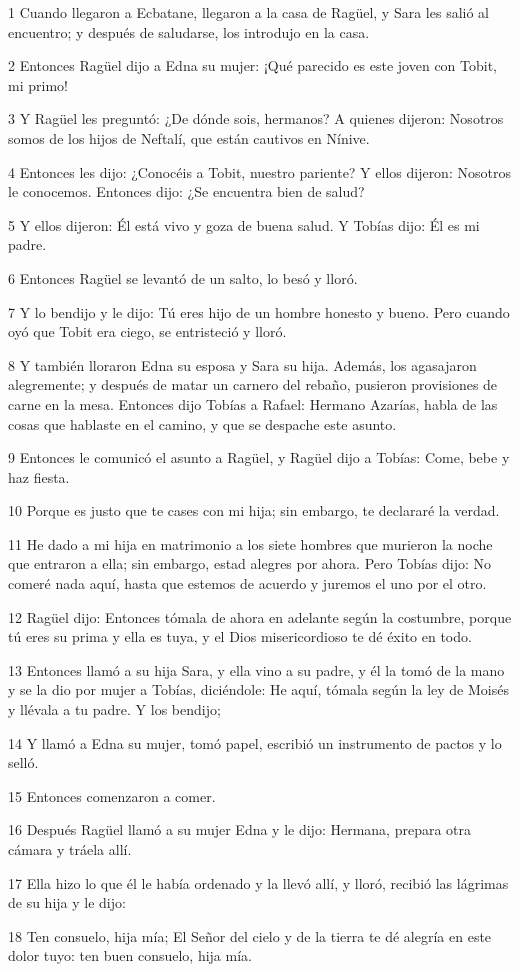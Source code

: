 \par 1 Cuando llegaron a Ecbatane, llegaron a la casa de Ragüel, y Sara les salió al encuentro; y después de saludarse, los introdujo en la casa.
\par 2 Entonces Ragüel dijo a Edna su mujer: ¡Qué parecido es este joven con Tobit, mi primo!
\par 3 Y Ragüel les preguntó: ¿De dónde sois, hermanos? A quienes dijeron: Nosotros somos de los hijos de Neftalí, que están cautivos en Nínive.
\par 4 Entonces les dijo: ¿Conocéis a Tobit, nuestro pariente? Y ellos dijeron: Nosotros le conocemos. Entonces dijo: ¿Se encuentra bien de salud?
\par 5 Y ellos dijeron: Él está vivo y goza de buena salud. Y Tobías dijo: Él es mi padre.
\par 6 Entonces Ragüel se levantó de un salto, lo besó y lloró.
\par 7 Y lo bendijo y le dijo: Tú eres hijo de un hombre honesto y bueno. Pero cuando oyó que Tobit era ciego, se entristeció y lloró.
\par 8 Y también lloraron Edna su esposa y Sara su hija. Además, los agasajaron alegremente; y después de matar un carnero del rebaño, pusieron provisiones de carne en la mesa. Entonces dijo Tobías a Rafael: Hermano Azarías, habla de las cosas que hablaste en el camino, y que se despache este asunto.
\par 9 Entonces le comunicó el asunto a Ragüel, y Ragüel dijo a Tobías: Come, bebe y haz fiesta.
\par 10 Porque es justo que te cases con mi hija; sin embargo, te declararé la verdad.
\par 11 He dado a mi hija en matrimonio a los siete hombres que murieron la noche que entraron a ella; sin embargo, estad alegres por ahora. Pero Tobías dijo: No comeré nada aquí, hasta que estemos de acuerdo y juremos el uno por el otro.
\par 12 Ragüel dijo: Entonces tómala de ahora en adelante según la costumbre, porque tú eres su prima y ella es tuya, y el Dios misericordioso te dé éxito en todo.
\par 13 Entonces llamó a su hija Sara, y ella vino a su padre, y él la tomó de la mano y se la dio por mujer a Tobías, diciéndole: He aquí, tómala según la ley de Moisés y llévala a tu padre. Y los bendijo;
\par 14 Y llamó a Edna su mujer, tomó papel, escribió un instrumento de pactos y lo selló.
\par 15 Entonces comenzaron a comer.
\par 16 Después Ragüel llamó a su mujer Edna y le dijo: Hermana, prepara otra cámara y tráela allí.
\par 17 Ella hizo lo que él le había ordenado y la llevó allí, y lloró, recibió las lágrimas de su hija y le dijo:
\par 18 Ten consuelo, hija mía; El Señor del cielo y de la tierra te dé alegría en este dolor tuyo: ten buen consuelo, hija mía.

